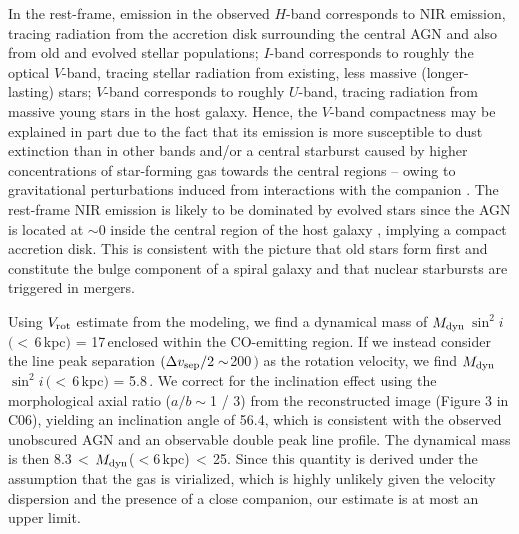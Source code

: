 \documentclass[]{emulateapj}
\begin{document}
In the rest-frame, 
emission in the observed $H$-band corresponds to NIR emission, 
tracing radiation from the accretion disk surrounding
the central AGN and also from old and evolved stellar populations; 
$I$-band corresponds to roughly the optical $V$-band, tracing stellar radiation from
existing, less massive (\ie longer-lasting) stars;
$V$-band corresponds to roughly $U$-band,  tracing radiation from massive young stars 
in the host galaxy. Hence,
the $V$-band compactness may be explained in part
due to the fact that its emission is
more susceptible to dust extinction than in other bands and/or 
a central starburst caused by higher 
concentrations of star-forming gas towards the central regions -- owing to
gravitational perturbations induced
from interactions with the companion
\citep[\eg][]{DiMatteo05a}.
The rest-frame NIR emission is likely to be
dominated by evolved stars since 
the AGN is located at $\sim$0 inside the central region %
of the host galaxy \citep{Sluse06a}, implying a compact accretion disk. 
This is consistent with the picture that old stars form first and constitute the bulge component  
of a spiral galaxy and that nuclear starbursts are triggered in mergers.

Using $V_{\rm rot}$ estimate from the modeling, we find a dynamical mass of
$M_{\rm dyn}$\,$\sin^2 i$\,$(<$\,6\,kpc$)$ = 17\,\Msun enclosed
within the CO-emitting region. If we instead consider the
\bco line peak separation $(\Delta v_{\rm sep}/2 \sim$200\,\kms$)$ as the rotation velocity, we find
$M_{\rm dyn}$\,$\sin^2 i$\,$(<$\,6\,kpc$)$ = 5.8\,\Msun.
We correct for the inclination effect using the
morphological axial ratio ($a/b\sim$1 / 3) 
from the reconstructed image (Figure 3 in C06), yielding
an inclination angle of 56.4\degr, which is consistent with the
observed unobscured AGN and an observable double peak line profile.
The dynamical mass is then
8.3\Msun\,$<$\,$M_{\rm dyn}$($<$6\,kpc)\,$<$\,25\Msun.
Since this quantity is derived under the assumption that the gas is
virialized, which is highly unlikely given the velocity dispersion and the
presence of a close companion, our estimate is
at most an upper limit.

\end{document}
